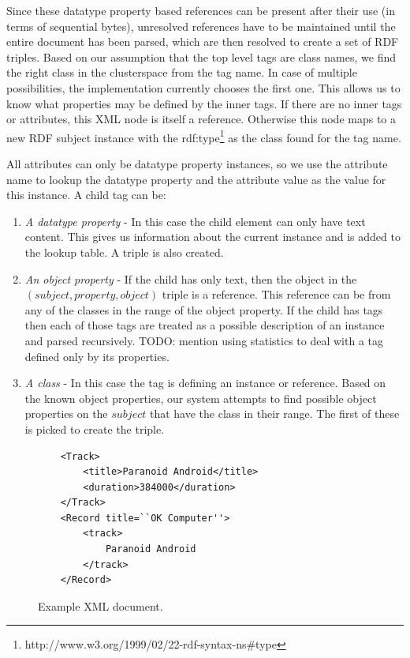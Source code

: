 \documentclass[conference]{IEEEtran}
\begin{document}
Since these datatype property based references can be present after their use
(in terms of sequential bytes), unresolved references have to be maintained
until the entire document has been parsed, which are then resolved to create
a set of RDF triples. Based on our assumption that the top level tags are class
names, we find the right class in the clusterspace from the tag name. In case
of multiple possibilities, the implementation currently chooses the first one.
This allows us to know what properties may be defined by the inner tags. If
there are no inner tags or attributes, this XML node is itself a reference.
Otherwise this node maps to a new RDF subject instance with the
rdf:type\footnote{http://www.w3.org/1999/02/22-rdf-syntax-ns\#type} as the
class found for the tag name.

All attributes can only be datatype property instances, so we use the attribute
name to lookup the datatype property and the attribute value as the value for
this instance. A child tag can be:
\begin{enumerate}
    \item \emph{A datatype property} - In this case the child element can only
        have text content. This gives us information about the current instance
        and is added to the lookup table. A triple is also created.
    \item \emph{An object property} - If the child has only text, then the
        object in the $(subject, property, object)$ triple is a reference. This
        reference can be from any of the classes in the range of the object
        property. If the child has tags then each of those tags are treated as
        a possible description of an instance and parsed recursively. TODO:
        mention using statistics to deal with a tag defined only by its
        properties.
    \item \emph{A class} - In this case the tag is defining an instance or
        reference. Based on the known object properties, our system attempts to
        find possible object properties on the $subject$ that have the class in
        their range. The first of these is picked to create the triple.
\end{enumerate}

\begin{figure}
    \caption{Example XML document.}
    \label{ex:xml-rec}
    \begin{verbatim}
    <Track>
        <title>Paranoid Android</title>
        <duration>384000</duration>
    </Track>
    <Record title=``OK Computer''>
        <track>
            Paranoid Android
        </track>
    </Record>
    \end{verbatim}
\end{figure}
\end{document}
